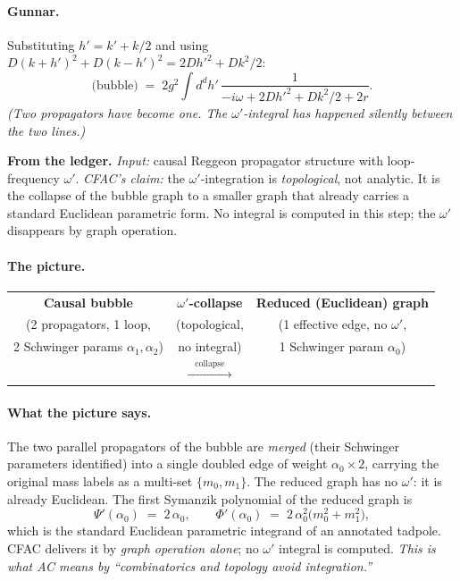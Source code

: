 \documentclass[11pt,a4paper]{article}
\newcommand{\bubblecausal}{%
\begin{tikzpicture}[baseline=-0.5ex,scale=1.05]
  \draw[thick,-{Stealth[length=2mm]}] (-1.5,0)--(-1.0,0);
  \draw[thick] (-1.0,0)--(-0.6,0);
  \draw[thick] (0,0) circle (0.6);
  \draw[thick] (0.6,0)--(1.0,0);
  \draw[thick,-{Stealth[length=2mm]}] (1.0,0)--(1.5,0);
  \filldraw[black] (-0.6,0) circle (0.07);
  \filldraw[black] ( 0.6,0) circle (0.07);
  \node at (0,0.85) {\scriptsize $\omega+\omega',\ k+k',\ m_{0}$};
  \node at (0,-0.85) {\scriptsize $\omega',\ k',\ m_{1}$};
  \node[left]  at (-1.5,0.0) {\scriptsize $\omega,k$};
  \node[right] at ( 1.5,0.0) {\scriptsize $\omega,k$};
  \node at (0,0.30) {\tiny $\alpha_{1}$};
  \node at (0,-0.30) {\tiny $\alpha_{2}$};
\end{tikzpicture}}
\newcommand{\bubblereduced}{%
\begin{tikzpicture}[baseline=-0.5ex,scale=1.05]
  \draw[thick,-{Stealth[length=2mm]}] (-1.5,0)--(-1.0,0);
  \draw[thick] (-1.0,0)--(-0.05,0);
  \draw[thick] (0.05,0)--(1.0,0);
  \draw[thick,-{Stealth[length=2mm]}] (1.0,0)--(1.5,0);
  \draw[ultra thick,cfacgreen!60!black] (0,0) .. controls (-0.7,0.95) and (0.7,0.95) .. (0,0);
  \filldraw[black] (0,0) circle (0.07);
  \node[cfacgreen!50!black] at (0,1.05) {\scriptsize $\alpha_{0}\;[\times 2]$};
  \node at (0,-0.30) {\scriptsize masses $\{m_{0},m_{1}\}$};
  \node[left]  at (-1.5,0.0) {\scriptsize $\omega,k$};
  \node[right] at ( 1.5,0.0) {\scriptsize $\omega,k$};
\end{tikzpicture}}
\begin{document}
\paragraph{Gunnar.} Substituting $h' = k' + k/2$ and using
$D(k+h')^{2}+D(k-h')^{2}=2D{h'}^{2}+Dk^{2}/2$:
\[
\text{(bubble)} \;=\; 2g^{2}\!\int\! d^{d}h'\,
\frac{1}{-i\omega + 2D{h'}^{2} + Dk^{2}/2 + 2r}.
\]
\noindent\emph{(Two propagators have become one. The $\omega'$-integral has happened
silently between the two lines.)}

\begin{cfacbox}
\textbf{From the ledger.} \emph{Input:} causal Reggeon propagator structure with
loop-frequency $\omega'$. \emph{CFAC's claim:} the $\omega'$-integration is
\emph{topological}, not analytic. It is the collapse of the bubble graph to a smaller
graph that already carries a standard Euclidean parametric form. No integral is computed
in this step; the $\omega'$ disappears by graph operation.

\paragraph{The picture.}
\begin{center}
\renewcommand{\arraystretch}{1.0}
\begin{tabular}{@{}c@{\quad}c@{\quad}c@{}}
\toprule
\textbf{Causal bubble} & \textbf{$\omega'$-collapse} & \textbf{Reduced (Euclidean) graph} \\
(2 propagators, 1 loop, & (topological, & (1 effective edge, no $\omega'$, \\
2 Schwinger params $\alpha_{1},\alpha_{2}$) & no integral) & 1 Schwinger param $\alpha_{0}$)\\
\midrule
\bubblecausal &
\;$\xrightarrow{\;\;\;\text{collapse}\;\;\;}$\; &
\bubblereduced \\
\bottomrule
\end{tabular}
\end{center}

\paragraph{What the picture says.} The two parallel propagators of the bubble are
\emph{merged} (their Schwinger parameters identified) into a single doubled edge of
weight $\alpha_{0}\times 2$, carrying the original mass labels as a multi-set
$\{m_{0},m_{1}\}$. The reduced graph has no $\omega'$: it is already Euclidean.
The first Symanzik polynomial of the reduced graph is
\[
\boxed{\;\Psi'(\alpha_{0}) \;=\; 2\,\alpha_{0},\qquad
\Phi'(\alpha_{0}) \;=\; 2\,\alpha_{0}^{2}\bigl(m_{0}^{2}+m_{1}^{2}\bigr),\;}
\]
which is the standard Euclidean parametric integrand of an annotated tadpole. CFAC
delivers it by \emph{graph operation alone}; no $\omega'$ integral is computed. \emph{This
is what AC means by ``combinatorics and topology avoid integration.''}


\end{cfacbox}
\end{document}
